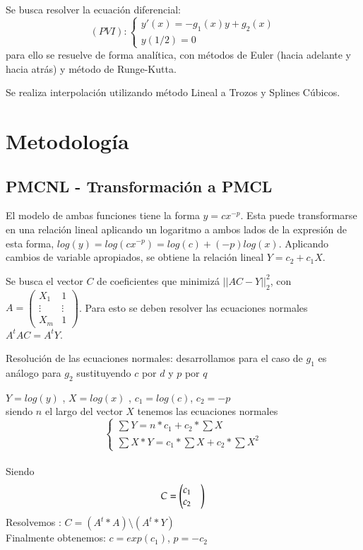 \documentclass{endm}
\begin{document}
Se busca resolver la ecuación diferencial:
\begin{equation*}
    (PVI):\begin{cases}
        y'(x) = -g_1(x)y + g_2(x) \\
        y(1/2) = 0
    \end{cases}
\end{equation*}
para ello se resuelve de forma analítica, con métodos de Euler (hacia adelante y hacia atrás) y método de Runge-Kutta.

Se realiza interpolación utilizando método Lineal a Trozos y Splines Cúbicos.
\section{Metodología}\label{AA}

\subsection{PMCNL - Transformación a PMCL}
El modelo de ambas funciones tiene la forma $y = cx^{-p}$. Esta puede transformarse en una relación
lineal aplicando un logaritmo a ambos lados de la expresión de esta forma, $log(y) = log(cx^{-p}) = log(c) + (-p)log(x)$.
Aplicando cambios de variable apropiados, se obtiene la relación lineal $Y = c_2 + c_1X$.

Se busca el vector $C$ de coeficientes que minimizá $||AC - Y||^2_2$,
con $A = \begin{pmatrix}X_1 & 1 \\ \vdots & \vdots \\ X_m & 1 \end{pmatrix}$.
Para esto se deben resolver las ecuaciones normales $A^tAC = A^tY$.

Resolución de las ecuaciones normales:
desarrollamos para el caso de $g_{1}$ es análogo para $g_{2}$ sustituyendo $c$ por $d$ y $p$ por $q$ 

$Y =log(y)$ , $X =log(x)$ , $c_1= log(c)$, $c_2= -p$ \\
siendo $n$ el largo del vector $X$ tenemos las ecuaciones normales
\begin{equation}
\begin{cases}
\sum Y = n * c_1 + c_2 * \sum X \\
\sum X * Y = c_1 * \sum X + c_2 * \sum X^2
\end{cases}
\end{equation}  \\
Siendo \begin{equation*}C=\begin{pmatrix}
          c_1 & \\
          c_2
         \end{pmatrix} \\
\end{equation*}
Resolvemos : $ C=(A^t * A) \setminus  (A^t * Y)$ \\
Finalmente obtenemos:  $c= exp(c_1)$, $p = -c_2$ \\
\end{document}
